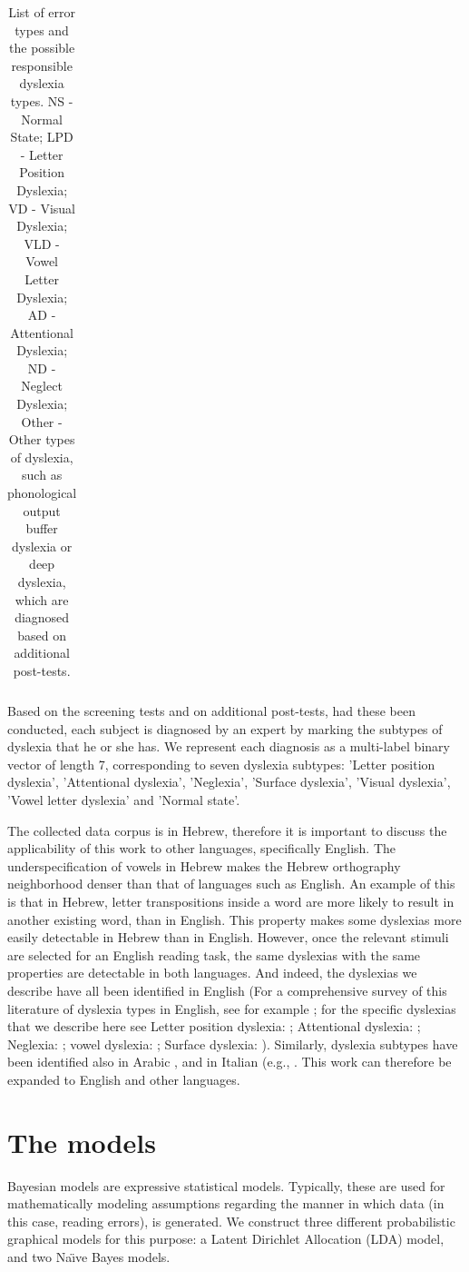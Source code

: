 {\begin{table}
\begin{tabular}{|c|c|c|}
\hline\end{tabular}
\bigskip
\caption{List of error types and the possible responsible dyslexia types. NS - Normal State; LPD - Letter Position Dyslexia; VD - Visual Dyslexia; VLD - Vowel Letter Dyslexia; AD - Attentional Dyslexia; ND - Neglect Dyslexia; Other - Other types of dyslexia, such as phonological output buffer dyslexia or deep dyslexia, which are diagnosed based on additional post-tests.}
\end{table}

Based on the screening tests and on additional post-tests, had these been conducted, each subject is diagnosed by an expert by marking the subtypes of dyslexia that he or she has. We represent each diagnosis as a multi-label binary vector of length 7, corresponding to seven dyslexia subtypes: 'Letter position dyslexia', 'Attentional dyslexia', 'Neglexia', 'Surface dyslexia', 'Visual dyslexia', 'Vowel letter dyslexia' and 'Normal state'.

The collected data corpus is in Hebrew, therefore it is important to discuss the applicability of this work to other languages, specifically English. The underspecification of vowels in Hebrew makes the Hebrew orthography neighborhood denser than that of languages such as English. An example of this is that in Hebrew, letter transpositions inside a word are more likely to result in another existing word, than in English. This property makes some dyslexias more easily detectable in Hebrew than in English. However, once the relevant stimuli are selected for an English reading task, the same dyslexias with the same properties are detectable in both languages. And indeed, the dyslexias we describe have all been identified in English (For a comprehensive survey of this literature of dyslexia types in English, see for example \citealp{ck12}; for the specific dyslexias that we describe here see Letter position dyslexia: \citealp{kohnen2012slime}; Attentional dyslexia: \citealp{sc98, sw77}; Neglexia: \citealp{vba10}; vowel dyslexia: \citealp{kf11}; Surface dyslexia: \citealp{bd95, cbc06, cc93, c83}). Similarly, dyslexia subtypes have been identified also in Arabic \citep{friedmann2012letter, friedmann2014types}, and in Italian (e.g., \citealp{job1984developmental}. This work can therefore be expanded to English and other languages.

\section{The models}
Bayesian models are expressive statistical models. Typically, these are used for mathematically modeling assumptions regarding the manner in which data (in this case, reading errors), is generated. We construct three different probabilistic graphical models for this purpose: a Latent Dirichlet Allocation (LDA) model, and two Na\"{\i}ve Bayes models.

}

